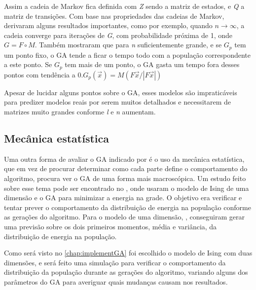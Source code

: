 Assim a cadeia de Markov fica definida com \textit{Z} sendo a matriz de estados, e \textit{Q} a matriz de transições. Com base nas propriedades das cadeias de Markov, \citeauthor{Nix1992} derivaram alguns resultados importantes, como por exemplo, quando \(n \to \infty\), a cadeia converge para iterações de \textit{G}, com probabilidade próxima de 1, onde \(G = F \circ M \). Também mostraram que para \textit{n} suficientemente grande, e se \(G_p\) tem um ponto fixo, o GA tende a ficar o tempo todo com a população correspondente a este ponto. Se \(G_p\) tem mais de um ponto, o GA gasta um tempo fora desses pontos com tendência a 0.\(G_p(\overrightarrow{x}) = M \left( {F \overrightarrow{x}}/{\left| F \overrightarrow{x} \right|} \right) \)

Apesar de lucidar alguns pontos sobre o GA, esses modelos são impraticáveis para predizer modelos reais por serem muitos detalhados e necessitarem de matrizes muito grandes conforme \textit{l} e \textit{n} aumentam.

\subsection{Mecânica estatística}
Uma outra forma de avaliar o GA indicado por \citeauthor{Mitchell1996} é o uso da mecânica estatística, que em vez de procurar determinar como cada parte define o comportamento do algoritmo, procura ver o GA de uma forma mais macroscópica. Um estudo feito sobre esse tema pode ser encontrado no , onde usaram o modelo de Ising de uma dimensão e o GA para minimizar a energia na grade. O objetivo era verificar e tentar prever o comportamento da distribuição de energia na população conforme as gerações do algoritmo. Para o modelo de uma dimensão, \citeauthor{Pruegel-Bennett1994}, conseguiram gerar uma previsão sobre os dois primeiros momentos, média e variância, da distribuição de energia na população.

Como será visto no \autoref{chap:implementGA} foi escolhido o modelo de Ising com duas dimensões, e será feito uma simulação para verificar o comportamento da distribuição da população durante as gerações do algoritmo, variando alguns dos parâmetros do GA para averiguar quais mudanças causam nos resultados.

